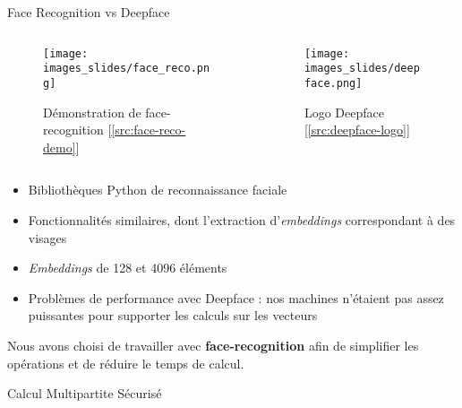 \documentclass[9pt]{beamer}
\begin{document}
\begin{frame}{Face Recognition vs Deepface}
\begin{columns}[T] %
    \begin{column}{.48\textwidth}
        \begin{center}
            \begin{figure}
            \centering
            \texttt{[image: images\_slides/face\_reco.png]}
            \caption{Démonstration de face-recognition [\ref{src:face-reco-demo}]}
            \label{fig:enter-label}
            \end{figure}
        \end{center}
    \end{column}%
    \hfill%
    \begin{column}{.48\textwidth}
        \begin{center}
            \begin{figure}
            \centering
            \texttt{[image: images\_slides/deepface.png]}
            \caption{Logo Deepface [\ref{src:deepface-logo}]}
            \label{fig:enter-label}
            \end{figure}
        \end{center}
    \end{column}%
    \end{columns}
\begin{itemize}
    \item Bibliothèques Python de reconnaissance faciale
    \item Fonctionnalités similaires, dont l'extraction d'\textit{embeddings} correspondant à des visages
    \item \textit{Embeddings} de 128 et 4096 éléments
    \item Problèmes de performance avec Deepface : nos machines n'étaient pas assez puissantes pour supporter les calculs sur les vecteurs
\end{itemize}
Nous avons choisi de travailler avec \textbf{face-recognition} afin de simplifier les opérations et de réduire le temps de calcul.
    
\end{frame}

\begin{frame}{Calcul Multipartite Sécurisé}
    
\end{frame}
\end{document}
